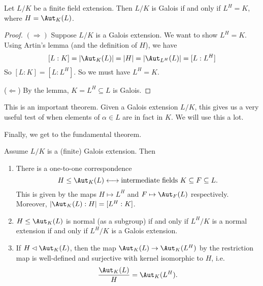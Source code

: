 \documentclass[a4paper]{article}
\begin{document}
\begin{thm}
  Let $L/K$ be a finite field extension. Then $L/K$ is Galois if and only if $L^H = K$, where $H = \Aut_K(L)$.
\end{thm}

\begin{proof}
  $(\Rightarrow)$ Suppose $L/K$ is a Galois extension. We want to show $L^H = K$. Using Artin's lemma (and the definition of $H$), we have
  \[
    [L:K] = |\Aut_K(L)| = |H| = |\Aut_{L^H}(L)| = [L:L^H]
  \]
  So $[L:K] = [L:L^H]$. So we must have $L^H = K$.

  ($\Leftarrow$) By the lemma, $K = L^H \subseteq L$ is Galois.
\end{proof}

This is an important theorem. Given a Galois extension $L/K$, this gives us a very useful test of when elements of $\alpha \in L$ are in fact in $K$. We will use this a lot.

Finally, we get to the fundamental theorem.
\begin{thm}
  Assume $L/K$ is a (finite) Galois extension. Then
  \begin{enumerate}
    \item There is a one-to-one correspondence
      \[
        H\leq \Aut_K(L) \longleftrightarrow \text{intermediate fields }K\subseteq F \subseteq L.
      \]
      This is given by the maps $H \mapsto L^H$ and $F\mapsto \Aut_F(L)$ respectively. Moreover, $|\Aut_K(L):H| = [L^H:K]$.
    \item $H\leq \Aut_K(L)$ is normal (as a subgroup) if and only if $L^H/K$ is a normal extension if and only if $L^H/K$ is a Galois extension.
    \item If $H\lhd \Aut_K(L)$, then the map $\Aut_K(L) \to \Aut_K(L^H)$ by the restriction map is well-defined and surjective with kernel isomorphic to $H$, i.e.
      \[
        \frac{\Aut_K(L)}{H} = \Aut_K(L^H).
      \]
  \end{enumerate}
\end{thm}
\end{document}
